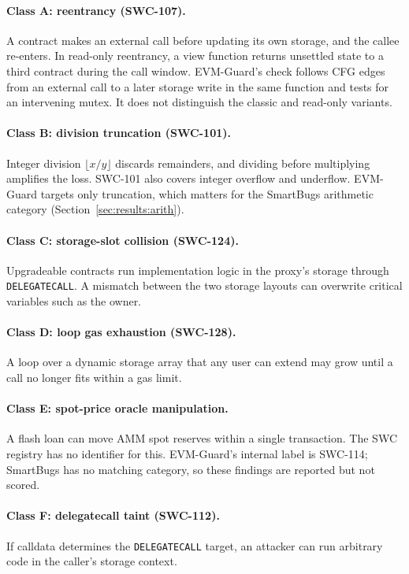 \documentclass[pdflatex,sn-mathphys]{sn-jnl}
\theoremstyle{thmstyleone}
\theoremstyle{thmstyletwo}
\begin{document}
\paragraph{Class A: reentrancy (SWC-107).} A contract makes an external call before updating its own storage, and the callee re-enters. In read-only reentrancy, a view function returns unsettled state to a third contract during the call window. EVM-Guard's check follows CFG edges from an external call to a later storage write in the same function and tests for an intervening mutex. It does not distinguish the classic and read-only variants.

\paragraph{Class B: division truncation (SWC-101).} Integer division $\lfloor x/y \rfloor$ discards remainders, and dividing before multiplying amplifies the loss. SWC-101 also covers integer overflow and underflow. EVM-Guard targets only truncation, which matters for the SmartBugs arithmetic category (Section~\ref{sec:results:arith}).

\paragraph{Class C: storage-slot collision (SWC-124).} Upgradeable contracts run implementation logic in the proxy's storage through \texttt{DELEGATECALL}. A mismatch between the two storage layouts can overwrite critical variables such as the owner.

\paragraph{Class D: loop gas exhaustion (SWC-128).} A loop over a dynamic storage array that any user can extend may grow until a call no longer fits within a gas limit.

\paragraph{Class E: spot-price oracle manipulation.} A flash loan can move AMM spot reserves within a single transaction. The SWC registry has no identifier for this. EVM-Guard's internal label is SWC-114; SmartBugs has no matching category, so these findings are reported but not scored.

\paragraph{Class F: delegatecall taint (SWC-112).} If calldata determines the \texttt{DELEGATECALL} target, an attacker can run arbitrary code in the caller's storage context.
\end{document}
